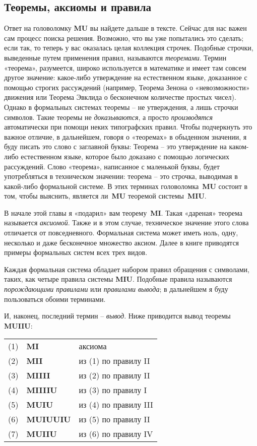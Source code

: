 \documentclass[../main.tex]{subfiles}
\begin{document}
\subsection{Теоремы, аксиомы и правила}

Ответ на головоломку \textbf{MU} вы найдете дальше в тексте. Сейчас для нас важен сам процесс поиска решения. Возможно, что вы уже попытались это сделать; если так, то теперь у вас оказалась целая коллекция строчек. Подобные строчки, выведенные путем применения правил, называются \emph{теоремами}. Термин «теорема», разумеется, широко используется в математике и имеет там совсем другое значение: какое-либо утверждение на естественном языке, доказанное с помощью строгих рассуждений (например, Теорема Зенона о «невозможности» движения или Теорема Эвклида о бесконечном количестве простых чисел). Однако в формальных системах теоремы \--- не утверждения, а лишь строчки символов. Такие теоремы не \emph{доказываются}, а просто \emph{производятся} автоматически при помощи неких типографских правил. Чтобы подчеркнуть это важное отличие, в дальнейшем, говоря о «теоремах» в обыденном значении, я буду писать это слово с заглавной буквы: Теорема \--- это утверждение на каком-либо естественном языке, которое было доказано с помощью логических рассуждений. Слово «теорема», написанное с маленькой буквы, будет употребляться в техническом значении: теорема \--- это строчка, выводимая в какой-либо формальной системе. В этих терминах головоломка~\textbf{MU} состоит в том, чтобы выяснить, является ли~\textbf{MU} теоремой системы~\textbf{MIU}.

В начале этой главы я «подарил» вам теорему~\textbf{MI}. Такая «дареная» теорема называется \emph{аксиомой}. Также и в этом случае, техническое значение этого слова отличается от повседневного. Формальная система может иметь ноль, одну, несколько и даже бесконечное множество аксиом. Далее в книге приводятся примеры формальных систем всех трех видов.

Каждая формальная система обладает набором правил обращения с символами, таких, как четыре правила системы \textbf{MIU}. Подобные правила называются \emph{порождающими правилами} или \emph{правилами вывода}; в дальнейшем я буду пользоваться обоими терминами.

И, наконец, последний термин \--- \emph{вывод}. Ниже приводится вывод теоремы \textbf{MUIIU}:

\begin{block}
\begin{tabular}{@{} r @{~} l @{\quad} l @{}}
    (1) & \textbf{MI} & аксиома \\
    (2) & \textbf{MII} & из (1) по правилу II \\
    (3) & \textbf{MIIII} & из (2) по правилу II \\
    (4) & \textbf{MIIIIU} & из (3) по правилу I \\
    (5) & \textbf{MUIU} & из (4) по правилу III \\
    (6) & \textbf{MUIUUIU} & из (5) по правилу II \\
    (7) & \textbf{MUIIU} & из (6) по правилу IV \\
\end{tabular}
\end{block}
\end{document}

